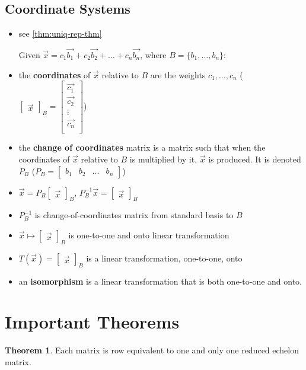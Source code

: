 \documentclass[a4paper,12pt]{article}
\theoremstyle{definition}
\newtheorem{theorem}{Theorem}
\theoremstyle{definition}
\newcommand{\mateq}[3]{#1#2 = #3}
\newcommand{\finitevecs}[2]{#1_1,\ldots,#1_#2}
\newcommand{\finitevecsset}[2]{\{\finitevecs{#1}{#2}\}}
\newcommand{\finiteadd}[3]{#1 + #2 + \ldots + #3}
\newcommand{\basiscoord}[2]{
	\begin{bmatrix}
		\vec{#1}
	\end{bmatrix}_#2
}
\begin{document}
	\subsection{Coordinate Systems}
	\begin{itemize}
		\item see \autoref{thm:uniq-rep-thm}
		
		Given $\vec{x} = \finiteadd{c_1\vec{b_1}}{c_2\vec{b_2}}{c_n\vec{b_n}}$, where $B = \finitevecsset{b}{n}$:
		
		\item the \textbf{coordinates} of $\vec{x}$ relative to $B$ are the weights $\finitevecs{c}{n}$ ($\basiscoord{x}{B}
		=
		\begin{bmatrix}
			\vec{c_1}\\
			\vec{c_2}\\
			\vdots\\
			\vec{c_n}\\
		\end{bmatrix}$)
		
		\item the \textbf{change of coordinates} matrix is a matrix such that when the coordinates of $\vec{x}$ relative to $B$ is multiplied by it, $\vec{x}$ is produced. It is denoted $P_B$ ($P_B =
		\begin{bmatrix}
			b_1 & b_2 & \ldots &b_n
		\end{bmatrix}$)
		
		\item $\vec{x} = P_B\basiscoord{x}{B}$, $P^{-1}_B\vec{x} = \basiscoord{x}{B}$
		
		\item $P^{-1}_B$ is change-of-coordinates matrix from standard basis to $B$
		
		\item $\vec{x} \mapsto \basiscoord{x}{B}$ is one-to-one and onto linear transformation
		
		\item $\mateq{T}{(\vec{x})}{\basiscoord{x}{B}}$ is a linear transformation, one-to-one, onto
		
		\item an \textbf{isomorphism} is a linear transformation that is both one-to-one and onto.
	\end{itemize}
	\newpage
	
	\section{Important Theorems}
	\begin{theorem}
		Each matrix is row equivalent to one and only one reduced echelon matrix.
	\end{theorem}
	
\end{document}

